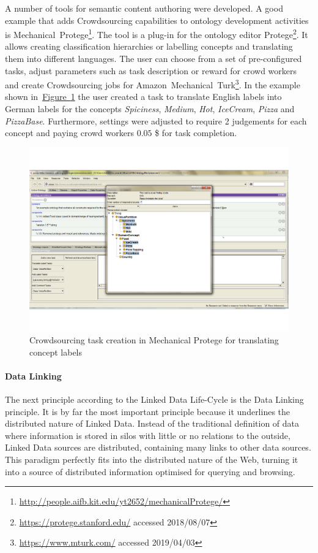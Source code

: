 A number of tools for semantic content authoring were developed. A good example that adds Crowdsourcing capabilities to ontology development activities is Mechanical~Protege\footnote{\url{http://people.aifb.kit.edu/yt2652/mechanicalProtege/}}. The tool is a plug-in for the ontology editor Protege\footnote{\url{https://protege.stanford.edu/} accessed 2018/08/07}. It allows creating classification hierarchies or labelling concepts and translating them into different languages. The user can choose from a set of pre-configured tasks, adjust parameters such as task description or reward for crowd workers and create Crowdsourcing jobs for Amazon~Mechanical~Turk\footnote{\url{https://www.mturk.com/} accessed 2019/04/03}. In the example shown in~\hyperref[fig:mechanical_protege_example]{Figure~\ref*{fig:mechanical_protege_example}} the user created a task to translate English labels into German labels for the concepts \emph{Spiciness}, \emph{Medium}, \emph{Hot}, \emph{IceCream}, \emph{Pizza} and \emph{PizzaBase}. Furthermore, settings were adjusted to require 2 judgements for each concept and paying crowd workers $0.05$ \$ for task completion.  
\begin{figure}
	 \centering
	 \includegraphics[width=1\textwidth]{graphics/mechanical_protege_example}
	 \caption{Crowdsourcing task creation in Mechanical Protege for translating concept labels}
	 \label{fig:mechanical_protege_example}
\end{figure}

\paragraph{Data Linking}
The next principle according to the Linked Data Life-Cycle is the Data Linking principle. It is by far the most important principle because it 
underlines the distributed nature of Linked Data. Instead of the traditional definition of data where information is stored in silos with little or no relations to the outside, Linked Data sources are distributed, containing many links to other data sources. This paradigm perfectly fits into the distributed nature of the Web, turning it into a source of distributed information optimised for querying and browsing. 

